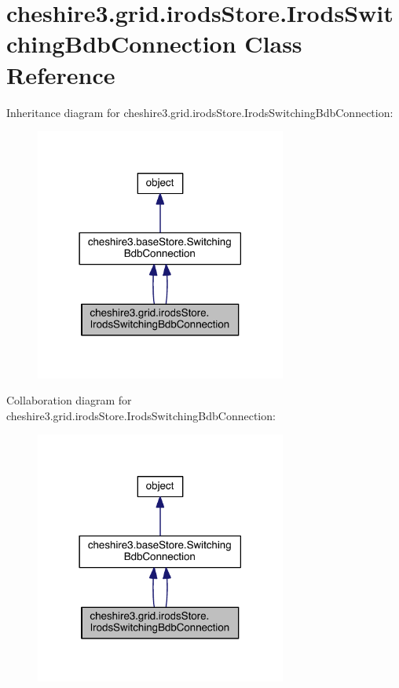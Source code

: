 \hypertarget{classcheshire3_1_1grid_1_1irods_store_1_1_irods_switching_bdb_connection}{\section{cheshire3.\-grid.\-irods\-Store.\-Irods\-Switching\-Bdb\-Connection Class Reference}
\label{classcheshire3_1_1grid_1_1irods_store_1_1_irods_switching_bdb_connection}
}


Inheritance diagram for cheshire3.\-grid.\-irods\-Store.\-Irods\-Switching\-Bdb\-Connection\-:
\nopagebreak
\begin{figure}[H]
\begin{center}
\leavevmode
\includegraphics[width=234pt]{classcheshire3_1_1grid_1_1irods_store_1_1_irods_switching_bdb_connection__inherit__graph}
\end{center}
\end{figure}


Collaboration diagram for cheshire3.\-grid.\-irods\-Store.\-Irods\-Switching\-Bdb\-Connection\-:
\nopagebreak
\begin{figure}[H]
\begin{center}
\leavevmode
\includegraphics[width=234pt]{classcheshire3_1_1grid_1_1irods_store_1_1_irods_switching_bdb_connection__coll__graph}
\end{center}
\end{figure}
